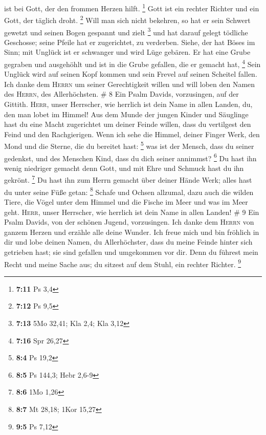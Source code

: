 ist bei Gott, der den frommen Herzen hilft. \footnote{\textbf{7:11} Ps
  3,4}  Gott ist ein rechter Richter und ein Gott, der
täglich droht. \footnote{\textbf{7:12} Ps 9,5}  Will man
sich nicht bekehren, so hat er sein Schwert gewetzt und seinen Bogen
gespannt und zielt \footnote{\textbf{7:13} 5Mo 32,41; Kla 2,4; Kla 3,12}
 und hat darauf gelegt tödliche Geschosse; seine Pfeile
hat er zugerichtet, zu verderben.  Siehe, der hat Böses
im Sinn; mit Unglück ist er schwanger und wird Lüge gebären.
 Er hat eine Grube gegraben und ausgehöhlt und ist in die
Grube gefallen, die er gemacht hat, \footnote{\textbf{7:16} Spr 26,27}
 Sein Unglück wird auf seinen Kopf kommen und sein Frevel
auf seinen Scheitel fallen.  Ich danke dem \textsc{Herrn}
um seiner Gerechtigkeit willen und will loben den Namen des
\textsc{Herrn}, des Allerhöchsten. \# 8  Ein Psalm Davids,
vorzusingen, auf der Gittith.  \textsc{Herr}, unser
Herrscher, wie herrlich ist dein Name in allen Landen, du, den man lobet
im Himmel!  Aus dem Munde der jungen Kinder und Säuglinge
hast du eine Macht zugerichtet um deiner Feinde willen, dass du
vertilgest den Feind und den Rachgierigen.  Wenn ich sehe
die Himmel, deiner Finger Werk, den Mond und die Sterne, die du bereitet
hast: \footnote{\textbf{8:4} Ps 19,2}  was ist der Mensch,
dass du seiner gedenkst, und des Menschen Kind, dass du dich seiner
annimmst? \footnote{\textbf{8:5} Ps 144,3; Hebr 2,6-9}  Du
hast ihn wenig niedriger gemacht denn Gott, und mit Ehre und Schmuck
hast du ihn gekrönt. \footnote{\textbf{8:6} 1Mo 1,26}  Du
hast ihn zum Herrn gemacht über deiner Hände Werk; alles hast du unter
seine Füße getan: \footnote{\textbf{8:7} Mt 28,18; 1Kor 15,27}
 Schafe und Ochsen allzumal, dazu auch die wilden Tiere,
 die Vögel unter dem Himmel und die Fische im Meer und was
im Meer geht.  \textsc{Herr}, unser Herrscher, wie
herrlich ist dein Name in allen Landen! \# 9  Ein Psalm
Davids, von der schönen Jugend, vorzusingen.  Ich danke
dem \textsc{Herrn} von ganzem Herzen und erzähle alle deine Wunder.
 Ich freue mich und bin fröhlich in dir und lobe deinen
Namen, du Allerhöchster,  dass du meine Feinde hinter sich
getrieben hast; sie sind gefallen und umgekommen vor dir. 
Denn du führest mein Recht und meine Sache aus; du sitzest auf dem
Stuhl, ein rechter Richter. \footnote{\textbf{9:5} Ps 7,12}
